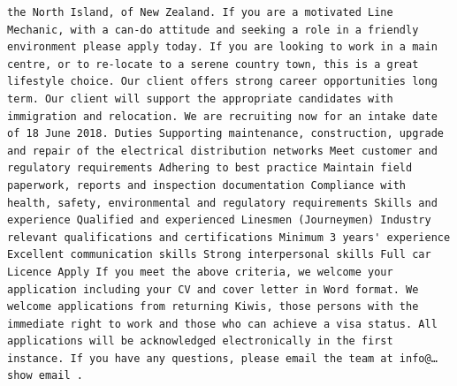 \documentclass[11pt,a4paper,]{article}
\begin{document}
\begin{verbatim}
the North Island, of New Zealand. If you are a motivated Line Mechanic, with a can-do attitude and seeking a role in a friendly environment please apply today. If you are looking to work in a main centre, or to re-locate to a serene country town, this is a great lifestyle choice. Our client offers strong career opportunities long term. Our client will support the appropriate candidates with immigration and relocation. We are recruiting now for an intake date of 18 June 2018. Duties Supporting maintenance, construction, upgrade and repair of the electrical distribution networks Meet customer and regulatory requirements Adhering to best practice Maintain field paperwork, reports and inspection documentation Compliance with health, safety, environmental and regulatory requirements Skills and experience Qualified and experienced Linesmen (Journeymen) Industry relevant qualifications and certifications Minimum 3 years' experience Excellent communication skills Strong interpersonal skills Full car Licence Apply If you meet the above criteria, we welcome your application including your CV and cover letter in Word format. We welcome applications from returning Kiwis, those persons with the immediate right to work and those who can achieve a visa status. All applications will be acknowledged electronically in the first instance. If you have any questions, please email the team at info@…show email .

\end{verbatim}
\end{document}
